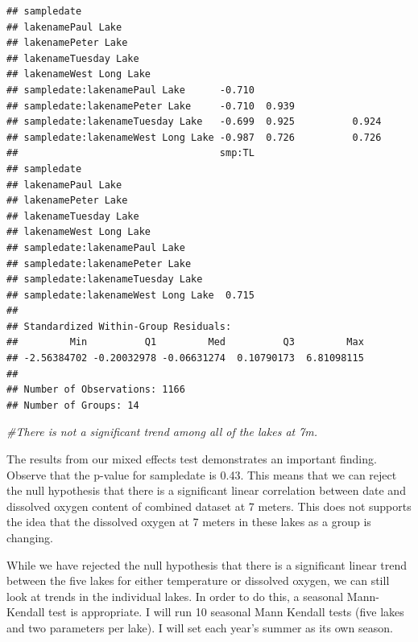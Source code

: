 \documentclass[12pt,]{article}
\newenvironment{Shaded}{\begin{snugshade}}{\end{snugshade}}
\newcommand{\CommentTok}[1]{\textcolor[rgb]{0.56,0.35,0.01}{\textit{#1}}}
\begin{document}
\begin{verbatim}
## sampledate                                                            
## lakenamePaul Lake                                                     
## lakenamePeter Lake                                                    
## lakenameTuesday Lake                                                  
## lakenameWest Long Lake                                                
## sampledate:lakenamePaul Lake      -0.710                              
## sampledate:lakenamePeter Lake     -0.710  0.939                       
## sampledate:lakenameTuesday Lake   -0.699  0.925          0.924        
## sampledate:lakenameWest Long Lake -0.987  0.726          0.726        
##                                   smp:TL
## sampledate                              
## lakenamePaul Lake                       
## lakenamePeter Lake                      
## lakenameTuesday Lake                    
## lakenameWest Long Lake                  
## sampledate:lakenamePaul Lake            
## sampledate:lakenamePeter Lake           
## sampledate:lakenameTuesday Lake         
## sampledate:lakenameWest Long Lake  0.715
## 
## Standardized Within-Group Residuals:
##         Min          Q1         Med          Q3         Max 
## -2.56384702 -0.20032978 -0.06631274  0.10790173  6.81098115 
## 
## Number of Observations: 1166
## Number of Groups: 14
\end{verbatim}

\begin{Shaded}
\begin{Highlighting}[]
\CommentTok{#There is not a significant trend among all of the lakes at 7m.}
\end{Highlighting}
\end{Shaded}

The results from our mixed effects test demonstrates an important
finding. Observe that the p-value for sampledate is 0.43. This means
that we can reject the null hypothesis that there is a significant
linear correlation between date and dissolved oxygen content of combined
dataset at 7 meters. This does not supports the idea that the dissolved
oxygen at 7 meters in these lakes as a group is changing.

While we have rejected the null hypothesis that there is a significant
linear trend between the five lakes for either temperature or dissolved
oxygen, we can still look at trends in the individual lakes. In order to
do this, a seasonal Mann-Kendall test is appropriate. I will run 10
seasonal Mann Kendall tests (five lakes and two parameters per lake). I
will set each year's summer as its own season.
\end{document}
